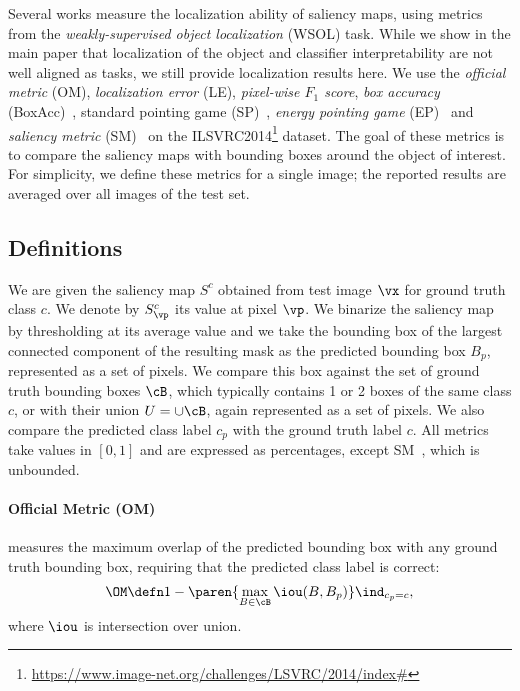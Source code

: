 Several works measure the localization ability of saliency maps, using metrics from the \emph{weakly-supervised object localization} (WSOL) task. While we show in the main paper that localization of the object and classifier interpretability are not well aligned as tasks, we still provide localization results here. We use the \emph{official metric} (OM), \emph{localization error} (LE), \emph{pixel-wise $F_1$ score}, \emph{box accuracy} (BoxAcc)~\citep{choe2020evaluating}, standard pointing game (SP)~\cite{zhang2018top}, \emph{energy pointing game} (EP)~\citep{wang2020score} and \emph{saliency metric} (SM)~\citep{dabkowski2017real} on the ILSVRC2014\footnote{\url{https://www.image-net.org/challenges/LSVRC/2014/index\#}} dataset. The goal of these metrics is to compare the saliency maps with bounding boxes around the object of interest. For simplicity, we define these metrics for a single image; the reported results are averaged over all images of the test set.

\subsection{Definitions}

We are given the saliency map $S^c$ obtained from test image $\vx$ for ground truth class $c$. We denote by $S^c_{\vp}$ its value at pixel $\vp$. We binarize the saliency map by thresholding at its average value and we take the bounding box of the largest connected component of the resulting mask as the predicted bounding box $B_p$, represented as a set of pixels. We compare this box against the set of ground truth bounding boxes $\cB$, which typically contains 1 or 2 boxes of the same class $c$, or with their union $U = \cup \cB$, again represented as a set of pixels. We also compare the predicted class label $c_p$ with the ground truth label $c$. All metrics take values in $[0,1]$ and are expressed as percentages, except SM~, which is unbounded.

\paragraph{Official Metric (OM)}

measures the maximum overlap of the predicted bounding box with any ground truth bounding box, requiring that the predicted class label is correct:
\begin{equation}
	\OM \defn 1 - \paren{\max_{B \in \cB} \iou(B, B_p)} \ind_{c_p = c},
\label{eq:om}
\end{equation}
where $\iou$ is intersection over union.

